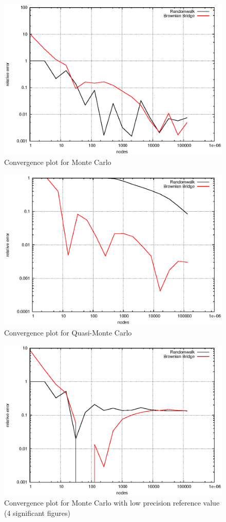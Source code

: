 \documentclass[]{article}
\begin{document}
\begin{figure}[!ht]
\centering
\includegraphics[width=.9\textwidth]{task2_mc_high.eps}
\caption{Convergence plot for Monte Carlo}
\label{fig:Task2a}
\end{figure}

\begin{figure}[!ht]
\centering
\includegraphics[width=.9\textwidth]{task2_qmc.eps}
\caption{Convergence plot for Quasi-Monte Carlo}
\label{fig:Task2b}
\end{figure}

\begin{figure}[!ht]
\centering
\includegraphics[width=.9\textwidth]{task2_mc_low.eps}
\caption{Convergence plot for Monte Carlo with low precision reference value (4 significant figures)}
\label{fig:Task2c}
\end{figure}
\clearpage
\end{document}
